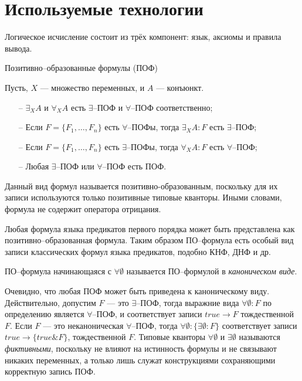 \section{Используемые технологии}

	Логическое исчисление состоит из трёх компонент: язык, аксиомы и правила вывода.
    
Позитивно--образованные формулы (ПОФ)

Пусть, $X$ --- множество переменных, и $A$ --- конъюнкт.
\begin{itemize}

\item[--]$\exists_XA$ и $\forall_XA$ есть $\exists$--ПОФ и $\forall$--ПОФ соответственно;

\item[--] Если $F = \{F_1,\ldots,F_n\}$ есть $\forall$--ПОФы, тогда $\exists_XA\colon F$ есть $\exists$--ПОФ;

\item[--] Если $F = \{F_1,\ldots,F_n\}$ есть $\exists$--ПОФы, тогда $\forall_XA\colon F$ есть $\forall$--ПОФ;

\item[--] Любая $\exists$--ПОФ или $\forall$--ПОФ есть ПОФ.

\end{itemize}


Данный вид формул называется позитивно-образованным, поскольку для их записи используются только позитивные типовые кванторы. Иными словами, формула не содержит оператора отрицания.

Любая формула языка предикатов первого порядка может быть представлена как позитивно--образованная формула. Таким образом ПО--формула есть особый вид записи классических формул языка предикатов, подобно КНФ, ДНФ и др.

ПО--формула начинающаяся с $\forall \emptyset$ называется ПО--формулой в {\em каноническом виде}.

Очевидно, что любая ПОФ может быть приведена к каноническому виду. Действительно, допустим $F$ --- это $\exists$--ПОФ, тогда выражние вида $\forall \emptyset\colon F$ по определению является $\forall$--ПОФ, и соответствует записи $true \rightarrow F$ тождественной $F$. Если $F$ --- это неканоническая $\forall$--ПОФ, тогда $\forall \emptyset\colon\{\exists \emptyset\colon F\}$ соответствует записи $true \rightarrow \{true\&F\}$, тождественной $F$. Типовые кванторы $\forall \emptyset$ и $\exists \emptyset$ называются {\em фиктивными}, поскольку не влияют на истинность формулы и не связывают никаких переменных, а только лишь служат конструкциями сохраняющими корректную запись ПОФ.

